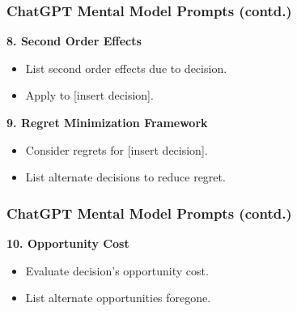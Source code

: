 \begin{frame}[fragile]\frametitle{ChatGPT Mental Model Prompts (contd.)}
\textbf{8. Second Order Effects}
\begin{itemize}
    \item List second order effects due to decision.
    \item Apply to [insert decision].
\end{itemize}

\textbf{9. Regret Minimization Framework}
\begin{itemize}
    \item Consider regrets for [insert decision].
    \item List alternate decisions to reduce regret.
\end{itemize}
\end{frame}

\begin{frame}[fragile]\frametitle{ChatGPT Mental Model Prompts (contd.)}
\textbf{10. Opportunity Cost}
\begin{itemize}
    \item Evaluate decision's opportunity cost.
    \item List alternate opportunities foregone.
\end{itemize}
\end{frame}